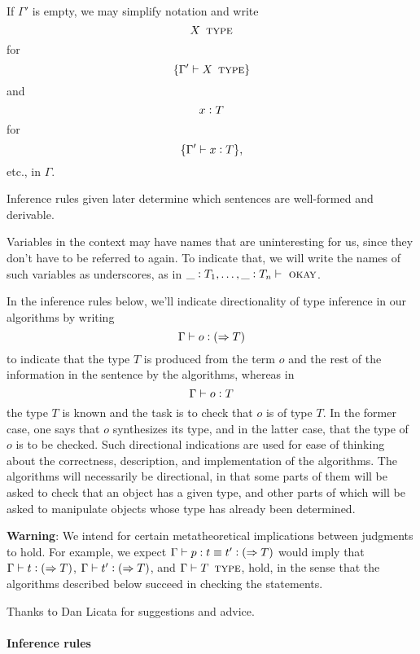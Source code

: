 \documentclass[11pt]{article}
\newcommand{\eqd}{\equiv}
\newcommand{\ccolon}[1]{\vcentcolon#1}
\newcommand{\synth}[1]{\vcentcolon(\Rightarrow#1)} %
\newcommand{\ccheck}[1]{\vcentcolon#1}  %
\newcommand{\Type}{\mathop{\text{ \sc type}}}
\newcommand{\Okay}{\mathop{\text{ \sc okay}}}
\newcommand{\var}{\char`_}
\begin{document}
If $\Gamma'$ is empty, we may simplify notation and write
$$ X \Type $$
for
$$\{ \Gamma'\vdash X \Type \}$$
and
$$x \ccolon{T}$$
for
$$\{ \Gamma'\vdash x \ccolon{T} \},$$
etc., in $\Gamma$.

Inference rules given later determine which sentences are well-formed and
derivable.

Variables in the context may have names that are uninteresting for us, since
they don't have to be referred to again.  To indicate that, we will write the
names of such variables as underscores, as in $\var \ccolon{T_1},\dots,\var
\ccolon{T_n}\vdash \Okay$.

In the inference rules below, we'll indicate directionality of type inference
in our algorithms by writing 
$$\Gamma\vdash o \synth{T}$$ to indicate that the type $T$ is produced
from the term $o$ and the rest of the information in the sentence by the
algorithms, whereas in $$\Gamma\vdash o \ccheck{T}$$ the type $T$ is known and
the task is to check that $o$ is of type $T$.  In the former case, one says
that $o$ synthesizes its type, and in the latter case, that the type of $o$ is
to be checked.  Such directional indications are used for ease of thinking
about the correctness, description, and implementation of the algorithms.  The
algorithms will necessarily be directional, in that some parts of them will be
asked to check that an object has a given type, and other parts of which will
be asked to manipulate objects whose type has already been determined.

{\bf Warning}: We intend for certain metatheoretical implications between
judgments to hold.  For example, we expect $\Gamma \vdash p : t \eqd t'
\synth{T}$ would imply that $\Gamma \vdash t \synth{T}$, $\Gamma \vdash t'
\synth{T}$, and $\Gamma \vdash T \Type$, hold, in the sense that the algorithms
described below succeed in checking the statements.

Thanks to Dan Licata for suggestions and advice.

\paragraph{Inference rules} 
\end{document}

